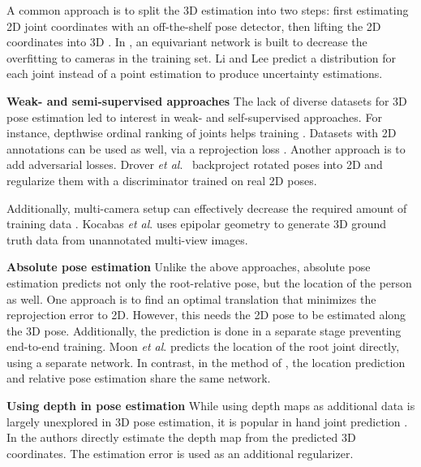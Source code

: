 \documentclass[runningheads]{llncs}
\def\etal{\emph{et al}.}
\begin{document}
A common approach is to split the 3D estimation into two steps: first estimating 2D joint coordinates with an off-the-shelf pose detector, then lifting the 2D coordinates into 3D \cite{fang2018posegrammar,li2019mdn,3dbaseline,veges2018siamese}. In \cite{veges2018siamese}, an equivariant network is built to decrease the overfitting to cameras in the training set. Li and Lee \cite{li2019mdn} predict a distribution for each joint instead of a point estimation to produce uncertainty estimations.

\textbf{Weak- and semi-supervised approaches} The lack of diverse datasets for 3D pose estimation led to interest in weak- and self-supervised approaches. For instance,  depthwise ordinal ranking of joints helps training \cite{pavlakos2018ordinal}. Datasets with 2D annotations can be used as well, via a reprojection loss \cite{zhou2017}.
Another approach is to add adversarial losses. Drover \etal ~\cite{drover_2dto3d} backproject rotated poses into 2D and regularize them with a discriminator trained on real 2D poses.

Additionally, multi-camera setup can effectively decrease the required amount of training data \cite{kocabas2019epipolar,helge_geometry-aware}. Kocabas \etal \cite{kocabas2019epipolar} uses epipolar geometry to generate 3D ground truth data from unannotated multi-view images.

\textbf{Absolute pose estimation} Unlike the above approaches, absolute pose estimation predicts not only the root-relative pose, but the location of the person as well. One approach is to find an optimal translation that minimizes the reprojection error \cite{mehta,zanfir2018smpl3dpose} to 2D. However, this needs the 2D pose to be estimated along the 3D pose. Additionally, the prediction is done in a separate stage preventing end-to-end training. Moon \etal \cite{moon2019camdistance} predicts the location of the root joint directly, using a separate network. In contrast, in the method of \cite{veges2019depthpose}, the location prediction and relative pose estimation share the same network. 

\textbf{Using depth in pose estimation} While using depth maps as additional data is largely unexplored in 3D pose estimation, it is popular in hand joint prediction \cite{wan2019selfsupervised-hand,cai2018weakhand,yuan2018privilegedhand}. In \cite{cai2018weakhand} the authors directly estimate the depth map from the predicted 3D coordinates. The estimation error is used as an additional regularizer.
\end{document}
